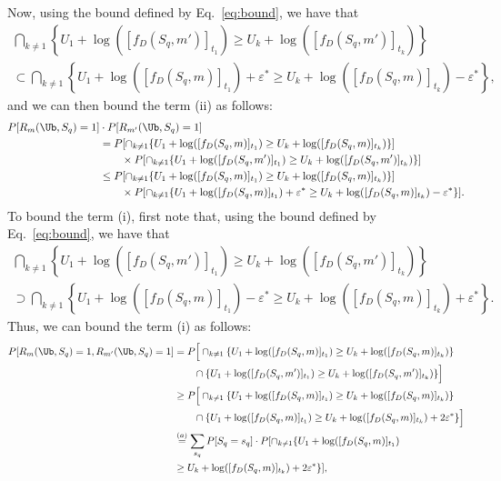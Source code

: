 Now, using the bound defined by Eq.~\ref{eq:bound}, we have that
%
\begin{multline*}
        \bigcap_{k\neq1} \left\{ U_1 + \log ( [f_D(S_q, m')]_{t_1} ) \geq U_k + \log ( [f_D(S_q, m')]_{t_k} ) \right\}\\
            \subset \bigcap_{k\neq1} \left\{U_1 + \log ( [f_D(S_q, m)]_{t_1} )+\varepsilon^* \geq U_k + \log ( [f_D(S_q, m)]_{t_k} )-\varepsilon^* \right\},
\end{multline*}
%
and we can then bound the term (ii) as follows:
    \begin{align*}
            \PP[R_m(\Ub,S_q)=1] &\cdot \PP[R_{m'}(\Ub,S_q)=1] \\
            &=
            \PP[\cap_{k\neq1} \{U_1 + \log ( [f_D(S_q,m)]_{t_1} ) \geq U_k + \log ( [f_D(S_q,m)]_{t_k} )\}]\\
            & \qquad \times \PP[\cap_{k\neq1}\{ U_1 + \log ( [f_D(S_q,m')]_{t_1} ) \geq U_k + \log ( [f_D(S_q,m')]_{t_k} ) \}]\\
            &\leq \PP[\cap_{k\neq1} \{U_1 + \log ( [f_D(S_q,m)]_{t_1} ) \geq U_k + \log ( [f_D(S_q,m)]_{t_k} )\}]\\
            & \qquad \times \PP[\cap_{k\neq1} \{U_1 + \log ( [f_D(S_q,m)]_{t_1} )+\varepsilon^* \geq U_k + \log ( [f_D(S_q,m)]_{t_k} )-\varepsilon^*\}].
    \end{align*}
%
To bound the term (i), first note that, using the bound defined by Eq.~\ref{eq:bound}, we have that
    \begin{multline*}
        \bigcap_{k\neq1} \left\{U_1 + \log ( [f_D(S_q,m')]_{t_1} ) \geq U_k + \log ( [f_D(S_q,m')]_{t_k} ) \right\}\\
         \supset \bigcap_{k\neq1} \left\{U_1 + \log ( [f_D(S_q,m)]_{t_1} )-\varepsilon^* \geq U_k + \log ( [f_D(S_q,m)]_{t_k} )+\varepsilon^* \right\}.
    \end{multline*} 
%        
Thus, we can bound the term (i) as follows:
%
    \begin{align*}
        \PP[R_m(\Ub,S_q)=1, R_{m'}(\Ub,S_q)=1] &=\PP\Big[\cap_{k\neq1} \{U_1 + \log ( [f_D(S_q,m)]_{t_1} ) \geq U_k + \log ([f_D(S_q,m)]_{t_k} )\}\\
            & \qquad \cap \{ U_1 + \log ( [f_D(S_q,m')]_{t_1} ) \geq U_k + \log ( [f_D(S_q,m')]_{t_k} ) \}\Big] \\
            & \geq \PP\Big[\cap_{k\neq1} \{U_1 + \log ( [f_D(S_q,m)]_{t_1} ) \geq U_k + \log ( [f_D(S_q,m)]_{t_k} )\}\\
            & \qquad \cap \{ U_1 + \log ( [f_D(S_q,m)]_{t_1} ) \geq U_k + \log ( [f_D(S_q,m)]_{t_k} ) +2\varepsilon^* \}\Big] \\
            & \overset{(a)}{=} \sum_{s_q} \PP[S_q=s_q]\cdot \PP[\cap_{k\neq1} \{ U_1 + \log ( [f_D(S_q,m)]_{t_1} ) \\
            & \geq U_k + \log ( [f_D(S_q,m)]_{t_k} ) +2\varepsilon^* \}],
    \end{align*}
